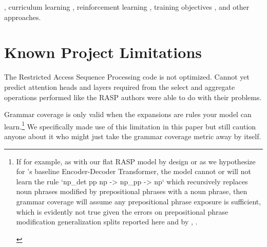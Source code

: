 \documentclass[11pt]{article}
\begin{document}
{\begin{footnotesize}
\end{footnotesize}
}, curriculum learning \cite{10.1145/1553374.1553380}, reinforcement learning \cite{Ranzato2015}, training objectives \cite{10.1162/tacl_a_00733}, and other approaches.

\section*{Known Project Limitations}

The Restricted Access Sequence Processing code is not optimized. Cannot yet predict attention heads and layers required from the select and aggregate operations performed like the RASP authors \cite{Weiss2021} were able to do with their problems.

Grammar coverage \cite{fuzzingbook2023:GrammarCoverageFuzzer} is only valid when the expansions are rules your model can learn.\footnote{\begin{footnotesize}If for example, as with our flat RASP model by design or as we hypothesize for \cite{Wu2023}'s baseline Encoder-Decoder Transformer, the model cannot or will not learn the rule `np\_det pp np -> np\_pp -> np` which recursively replaces noun phrases modified by prepositional phrases with a noun phrase, then grammar coverage will assume any prepositional phrase exposure is sufficient, which is evidently not true given the errors on prepositional phrase modification generalization splits reported here and by \cite{Wu2023}, \cite{KimLinzen2020}.
\end{footnotesize}
} We specifically made use of this limitation in this paper but still caution anyone about it who might just take the grammar coverage metric away by itself.
\end{document}
